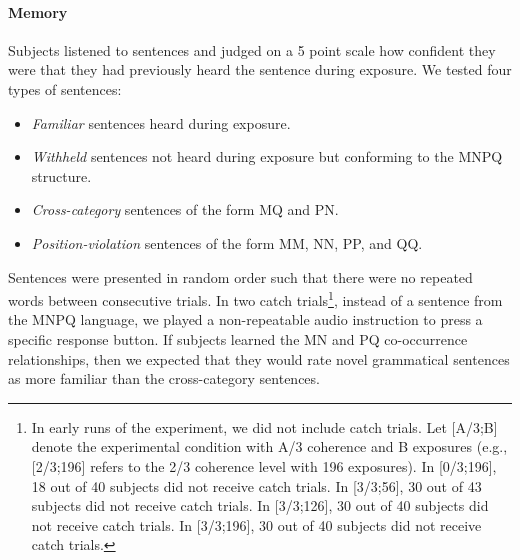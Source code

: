 \documentclass[man,floatsintext]{apa6}
\begin{document}
\paragraph{Memory}
Subjects listened to sentences and judged on a 5 point scale how confident they were that they had previously heard the sentence during exposure. We tested four types of sentences:

\begin{itemize}
\item \emph{Familiar} sentences heard during exposure.
\item \emph{Withheld} sentences not heard during exposure but conforming to the MNPQ structure.
\item \emph{Cross-category} sentences of the form MQ and PN.
\item \emph{Position-violation} sentences of the form MM, NN, PP, and QQ.
\end{itemize}

Sentences were presented in random order such that there were no repeated words between consecutive trials. In two catch trials\footnote{In early runs of the experiment, we did not include catch trials. 
  Let [A/3;B] denote the experimental condition with A/3 coherence and B exposures (e.g., [2/3;196] refers to the 2/3 coherence level with 196 exposures). In [0/3;196], 18 out of 40 subjects did not receive catch trials. In [3/3;56], 30 out of 43 subjects did not receive catch trials. In [3/3;126], 30 out of 40 subjects did not receive catch trials. In [3/3;196], 30 out of 40 subjects did not receive catch trials.}, instead of a sentence from the MNPQ language, we played a non-repeatable audio instruction to press a specific response button.  If subjects learned the MN and PQ co-occurrence relationships, then we expected that they would rate novel grammatical sentences as more familiar than the cross-category sentences.
\end{document}
